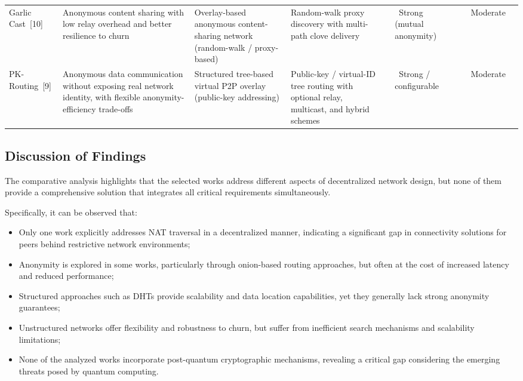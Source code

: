 \documentclass[12pt,a4paper]{article}
\newcommand{\statusyes}{\textcolor{green!50!black}{\ding{51}}}
\newcommand{\statusno}{\textcolor{red!70!black}{\ding{55}}}
\newcommand{\statuspositive}[1]{\statusyes~#1}
\newcommand{\statuspartial}[1]{\textcolor{orange!85!black}{\ding{108}}~#1}
\begin{document}
\begin{table}[H]
{\begin{tabular}{L{3cm}L{3cm}L{2.5cm}L{2.5cm}L{2cm}L{2cm}L{2cm}L{2cm}L{2cm}}
Garlic Cast~[10] & 
Anonymous content sharing with low relay overhead and better resilience to churn & 
Overlay-based anonymous content-sharing network (random-walk / proxy-based) & 
Random-walk proxy discovery with multi-path clove delivery & 
\statusno & 
\statuspositive{Strong (mutual anonymity)} & 
\statusno & 
\statuspartial{Moderate} & 
\statusno \\
\addlinespace

PK-Routing~[9] & 
Anonymous data communication without exposing real network identity, with flexible anonymity-efficiency trade-offs & 
Structured tree-based virtual P2P overlay (public-key addressing) & 
Public-key / virtual-ID tree routing with optional relay, multicast, and hybrid schemes & 
\statusno & 
\statuspositive{Strong / configurable} & 
\statusno & 
\statuspartial{Moderate} & 
\statusno \\

\bottomrule
\end{tabular}
}

\end{table}

\subsection{Discussion of Findings}

The comparative analysis highlights that the selected works address different aspects of decentralized network design, but none of them provide a comprehensive solution that integrates all critical requirements simultaneously.

Specifically, it can be observed that:
\begin{itemize}
    \item Only one work explicitly addresses NAT traversal in a decentralized manner, indicating a significant gap in connectivity solutions for peers behind restrictive network environments;
    \item Anonymity is explored in some works, particularly through onion-based routing approaches, but often at the cost of increased latency and reduced performance;
    \item Structured approaches such as DHTs provide scalability and data location capabilities, yet they generally lack strong anonymity guarantees;
    \item Unstructured networks offer flexibility and robustness to churn, but suffer from inefficient search mechanisms and scalability limitations;
    \item None of the analyzed works incorporate post-quantum cryptographic mechanisms, revealing a critical gap considering the emerging threats posed by quantum computing.
\end{itemize}
\end{document}
